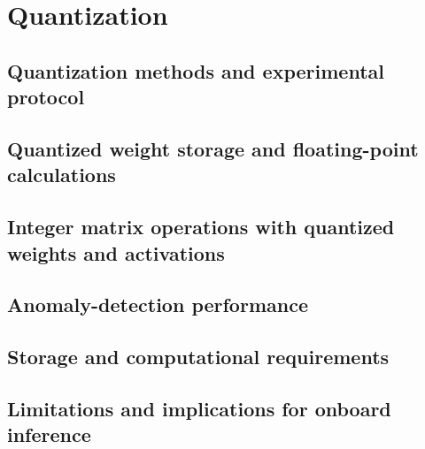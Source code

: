 \chapter{Quantization}
\label{chap:quantization}


\section{Quantization methods and experimental protocol}
\label{sec:quantization-protocol}

\section{Quantized weight storage and floating-point calculations}
\label{sec:quantization-weight-storage}

\section{Integer matrix operations with quantized weights and activations}
\label{sec:quantization-integer-operations}

\section{Anomaly-detection performance}
\label{sec:quantization-detection}

\section{Storage and computational requirements}
\label{sec:quantization-resources}

\section{Limitations and implications for onboard inference}
\label{sec:quantization-onboard}

